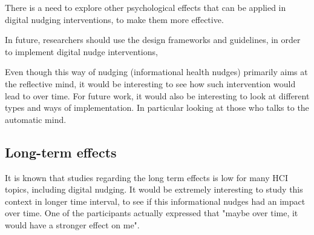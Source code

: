 There is a need to explore other psychological effects that can be applied in digital nudging interventions, to make them more effective.

In future, researchers should use the design frameworks and guidelines, in order to implement digital nudge interventions, 

Even though this way of nudging (informational health nudges) primarily aims at the reflective mind, it would be interesting to see how such intervention would lead to over time.  For future work, it would also be interesting to look at different types and ways of implementation. In particular looking at those who talks to the automatic mind. 



\subsection{Long-term effects}
It is known that studies regarding the long term effects is low for many HCI topics, including digital nudging. It would be extremely interesting to study this context in longer time interval, to see if this informational nudges had an impact over time. One of the participants actually expressed that "maybe over time, it would have a stronger effect on me". 